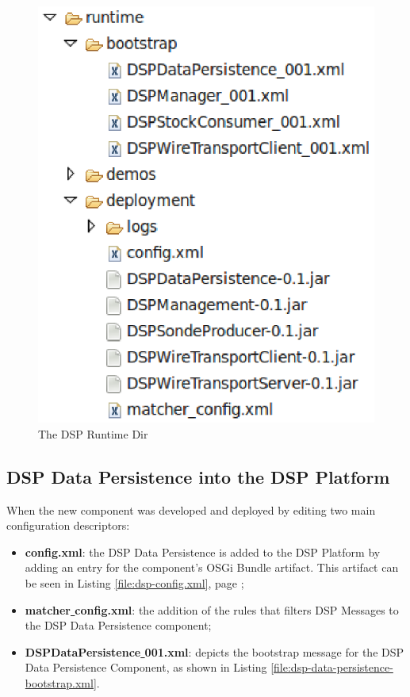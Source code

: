 \begin{figure}[!h]
  \centering
  \includegraphics[scale=0.65]{../diagrams/dsp-runtime-dir}
  \caption{The DSP Runtime Dir}
  \label{fig:dsp-runtime-dir}
\end{figure}

\subsection{DSP Data Persistence into the DSP Platform}
\label{sec:dsp-persistence-boostrap}

When the new component was developed and deployed by editing two main
configuration descriptors:

\begin{itemize}
  \item \textbf{config.xml}: the DSP Data Persistence is added to the DSP
  Platform by adding an entry for the component's OSGi Bundle artifact. This
  artifact can be seen in Listing \ref{file:dsp-config.xml}, page
  \pageref{file:dsp-config.xml};
  \item \textbf{matcher\underline{ }config.xml}: the addition of the rules that
  filters DSP Messages to the DSP Data Persistence component;
  \item \textbf{DSPDataPersistence\underline{ }001.xml}: depicts the bootstrap
  message for the DSP Data Persistence Component, as shown in Listing 
  \ref{file:dsp-data-persistence-bootstrap.xml}.
\end{itemize}

